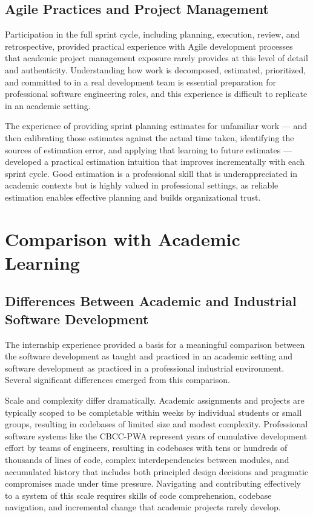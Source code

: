 \subsection{Agile Practices and Project Management}

Participation in the full sprint cycle, including planning, execution, review, and retrospective, provided practical experience with Agile development processes that academic project management exposure rarely provides at this level of detail and authenticity. Understanding how work is decomposed, estimated, prioritized, and committed to in a real development team is essential preparation for professional software engineering roles, and this experience is difficult to replicate in an academic setting.

The experience of providing sprint planning estimates for unfamiliar work — and then calibrating those estimates against the actual time taken, identifying the sources of estimation error, and applying that learning to future estimates — developed a practical estimation intuition that improves incrementally with each sprint cycle. Good estimation is a professional skill that is underappreciated in academic contexts but is highly valued in professional settings, as reliable estimation enables effective planning and builds organizational trust.

\section{Comparison with Academic Learning}

\subsection{Differences Between Academic and Industrial Software Development}

The internship experience provided a basis for a meaningful comparison between the software development as taught and practiced in an academic setting and software development as practiced in a professional industrial environment. Several significant differences emerged from this comparison.

Scale and complexity differ dramatically. Academic assignments and projects are typically scoped to be completable within weeks by individual students or small groups, resulting in codebases of limited size and modest complexity. Professional software systems like the CBCC-PWA represent years of cumulative development effort by teams of engineers, resulting in codebases with tens or hundreds of thousands of lines of code, complex interdependencies between modules, and accumulated history that includes both principled design decisions and pragmatic compromises made under time pressure. Navigating and contributing effectively to a system of this scale requires skills of code comprehension, codebase navigation, and incremental change that academic projects rarely develop.

